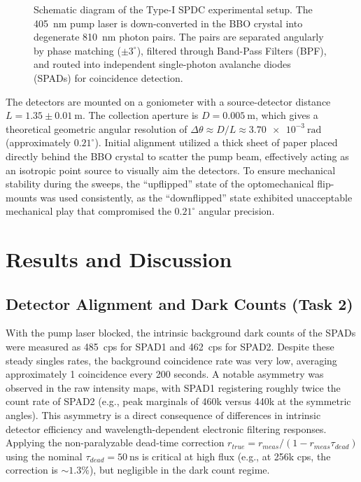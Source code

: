 \documentclass[12pt,a4paper]{article}
\begin{document}
\begin{figure}[H]
{
    }
    \caption{Schematic diagram of the Type-I SPDC experimental setup. The \SI{405}{\nano\meter} pump laser is down-converted in the BBO crystal into degenerate \SI{810}{\nano\meter} photon pairs. The pairs are separated angularly by phase matching ($\pm 3^\circ$), filtered through Band-Pass Filters (BPF), and routed into independent single-photon avalanche diodes (SPADs) for coincidence detection.}
    \label{fig:setup}
\end{figure}

The detectors are mounted on a goniometer with a source-detector distance $L = 1.35 \pm \SI{0.01}{\meter}$. The collection aperture is $D = \SI{0.005}{\meter}$, which gives a theoretical geometric angular resolution of $\Delta\theta \approx D/L \approx \SI{3.70e-3}{\radian}$ (approximately $0.21^\circ$). Initial alignment utilized a thick sheet of paper placed directly behind the BBO crystal to scatter the pump beam, effectively acting as an isotropic point source to visually aim the detectors. To ensure mechanical stability during the sweeps, the ``upflipped'' state of the optomechanical flip-mounts was used consistently, as the ``downflipped'' state exhibited unacceptable mechanical play that compromised the $0.21^\circ$ angular precision. 

\section{Results and Discussion}

\subsection{Detector Alignment and Dark Counts (Task 2)}

With the pump laser blocked, the intrinsic background dark counts of the SPADs were measured as \SI{485}{cps} for SPAD1 and \SI{462}{cps} for SPAD2. Despite these steady singles rates, the background coincidence rate was very low, averaging approximately 1 coincidence every 200 seconds. A notable asymmetry was observed in the raw intensity maps, with SPAD1 registering roughly twice the count rate of SPAD2 (e.g., peak marginals of 460k versus 440k at the symmetric angles). This asymmetry is a direct consequence of differences in intrinsic detector efficiency and wavelength-dependent electronic filtering responses. Applying the non-paralyzable dead-time correction $r_{true} = r_{meas}/(1 - r_{meas}\tau_{dead})$ using the nominal $\tau_{dead} = \SI{50}{\nano\second}$ is critical at high flux (e.g., at 256k cps, the correction is $\sim 1.3\%$), but negligible in the dark count regime.
\end{document}
